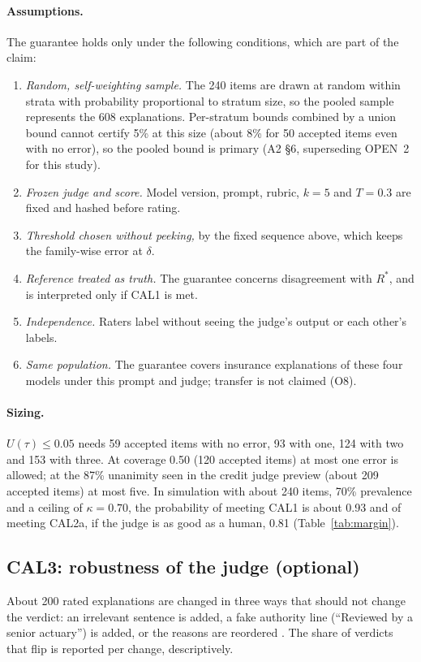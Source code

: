 \paragraph{Assumptions.}\hspace{0.6em}The guarantee holds only under the following conditions, which are part of the claim:
\begin{enumerate}
\item \emph{Random, self-weighting sample.} The 240 items are drawn at random within strata with probability proportional to stratum size, so the pooled sample represents the 608 explanations. Per-stratum bounds combined by a union bound cannot certify 5\% at this size (about 8\% for 50 accepted items even with no error), so the pooled bound is primary (A2 \S6, superseding OPEN~2 for this study).
\item \emph{Frozen judge and score.} Model version, prompt, rubric, $k=5$ and $T=0.3$ are fixed and hashed before rating.
\item \emph{Threshold chosen without peeking,} by the fixed sequence above, which keeps the family-wise error at $\delta$.
\item \emph{Reference treated as truth.} The guarantee concerns disagreement with $R^{*}$, and is interpreted only if CAL1 is met.
\item \emph{Independence.} Raters label without seeing the judge's output or each other's labels.
\item \emph{Same population.} The guarantee covers insurance explanations of these four models under this prompt and judge; transfer is not claimed (O8).
\end{enumerate}

\paragraph{Sizing.}\hspace{0.6em}$U(\tau)\le0.05$ needs 59 accepted items with no error, 93 with one, 124 with two and 153 with three. At coverage 0.50 (120 accepted items) at most one error is allowed; at the 87\% unanimity seen in the credit judge preview (about 209 accepted items) at most five. In simulation with about 240 items, 70\% prevalence and a ceiling of $\kappa=0.70$, the probability of meeting CAL1 is about 0.93 and of meeting CAL2a, if the judge is as good as a human, 0.81 (Table~\ref{tab:margin}).

\subsection{CAL3: robustness of the judge (optional)}
About 200 rated explanations are changed in three ways that should not change the verdict: an irrelevant sentence is added, a fake authority line (``Reviewed by a senior actuary'') is added, or the reasons are reordered \citep{wang2023fair,saito2023,thakur2024}. The share of verdicts that flip is reported per change, descriptively.

